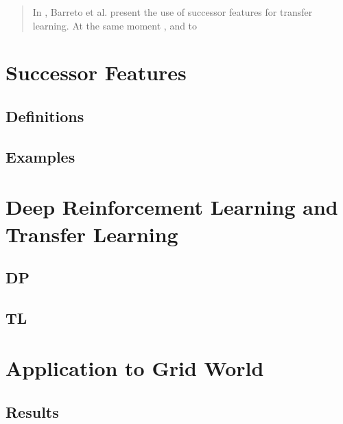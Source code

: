\documentclass[11pt]{article}
\begin{document}
\maketitle

\begin{abstract}
In \cite{DBLP:journals/corr/BarretoMSS16}, Barreto et al. present the use of successor features for transfer learning. At the same moment 
\cite{lehnert2017advantages}, \cite{barreto2017successor} and to \cite{kulkarni2016deep}

\end{abstract}


\tableofcontents



\section{Successor Features}
\subsection{Definitions}

\subsection{Examples}

\section{Deep Reinforcement Learning and Transfer Learning}

\subsection{DP}

\subsection{TL}

\section{Application to Grid World}

\subsection{Results}






\end{document}
